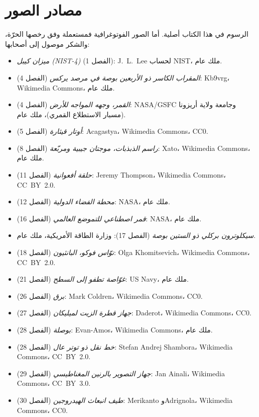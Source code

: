 \chapter*{مصادر الصور}

الرسوم في هذا الكتاب أصلية. أما الصور الفوتوغرافية فمستعملة وفق
رخصها الحرّة، والشكر موصول إلى أصحابها:

\begin{itemize}
  \item \emph{ميزان كيبل (NIST-4)} (الفصل 1): J.~L.~Lee لحساب
        NIST، ملك عام.
  \item \emph{المقراب الكاسر ذو الأربعين بوصة في مرصد يركس}
        (الفصل 4): Kb9vrg، Wikimedia Commons، ملك عام.
  \item \emph{القمر، وجهه المواجه للأرض} (الفصل 4): NASA/GSFC
        وجامعة ولاية أريزونا (مسبار الاستطلاع القمري)، ملك عام.
  \item \emph{أوتار قيثارة} (الفصل 5): Acagastya، Wikimedia
        Commons، CC0.
  \item \emph{راسم الذبذبات، موجتان جيبية ومربّعة} (الفصل 8):
        Xato، Wikimedia Commons، ملك عام.
  \item \emph{حلقة أفعوانية} (الفصل 11): Jeremy Thompson،
        Wikimedia Commons، CC~BY~2.0.
  \item \emph{محطة الفضاء الدولية} (الفصل 12): NASA، ملك عام.
  \item \emph{قمر اصطناعي للتموضع العالمي} (الفصل 16): NASA، ملك
        عام.
  \item \emph{سيكلوترون بركلي ذو الستين بوصة} (الفصل 17): وزارة
        الطاقة الأمريكية، ملك عام.
  \item \emph{نوّاس فوكو، البانثيون} (الفصل 18): Olga
        Khomitsevich، Wikimedia Commons، CC~BY~2.0.
  \item \emph{غوّاصة تطفو إلى السطح} (الفصل 21): US Navy، ملك عام.
  \item \emph{برق} (الفصل 26): Mark Coldren، Wikimedia Commons،
        CC0.
  \item \emph{جهاز قطرة الزيت لميليكان} (الفصل 27): Daderot،
        Wikimedia Commons، CC0.
  \item \emph{بوصلة} (الفصل 28): Evan-Amos، Wikimedia Commons، ملك
        عام.
  \item \emph{خط نقل ذو توتر عال} (الفصل 28): Stefan Andrej
        Shambora، Wikimedia Commons، CC~BY~2.0.
  \item \emph{جهاز التصوير بالرنين المغناطيسي} (الفصل 29): Jan
        Ainali، Wikimedia Commons، CC~BY~3.0.
  \item \emph{طيف انبعاث الهيدروجين} (الفصل 30): Merikanto
        وAdrignola، Wikimedia Commons، CC0.
\end{itemize}

